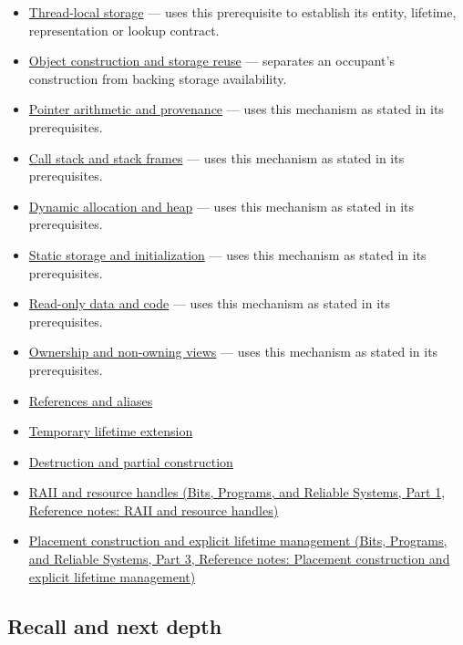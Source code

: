 \begin{itemize}
\tightlist
\item
  \hyperref[appendix-3b88c6cd7195]{Thread-local storage} --- uses this prerequisite to establish its entity, lifetime, representation or lookup contract.
\item
  \hyperref[appendix-a82f9c438857]{Object construction and storage reuse} --- separates an occupant's construction from backing storage availability.
\item
  \hyperref[appendix-6af5921bc853]{Pointer arithmetic and provenance} --- uses this mechanism as stated in its prerequisites.
\item
  \hyperref[appendix-b081b7abe193]{Call stack and stack frames} --- uses this mechanism as stated in its prerequisites.
\item
  \hyperref[appendix-c3480f7d9ff3]{Dynamic allocation and heap} --- uses this mechanism as stated in its prerequisites.
\item
  \hyperref[appendix-17c93c4c2f19]{Static storage and initialization} --- uses this mechanism as stated in its prerequisites.
\item
  \hyperref[appendix-5f9e5e2f0a5e]{Read-only data and code} --- uses this mechanism as stated in its prerequisites.
\item
  \hyperref[appendix-d52e4486f527]{Ownership and non-owning views} --- uses this mechanism as stated in its prerequisites.
\item
  \hyperref[appendix-d6d562ca9fbb]{References and aliases}
\item
  \hyperref[appendix-a978b29bbbb0]{Temporary lifetime extension}
\item
  \hyperref[appendix-9bfe377cef7a]{Destruction and partial construction}
\item
  \href{../01-Bits-Programs-and-Reliable-Systems-P01/main.pdf\#nameddest=appendix-69739d3ab49b}{RAII and resource handles (Bits, Programs, and Reliable Systems, Part 1, Reference notes: RAII and resource handles)}
\item
  \href{../01-Bits-Programs-and-Reliable-Systems-P03/main.pdf\#nameddest=appendix-f56c3e43fd4e}{Placement construction and explicit lifetime management (Bits, Programs, and Reliable Systems, Part 3, Reference notes: Placement construction and explicit lifetime management)}
\end{itemize}

\subsection{Recall and next depth}\label{appendix-0b104bcba06b-recall-and-next-depth}

